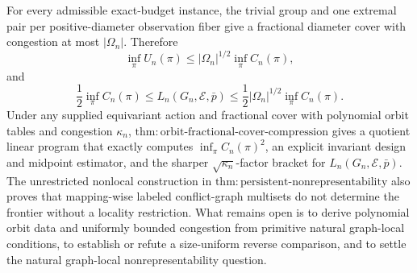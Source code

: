 For every admissible exact-budget instance, the trivial group and one extremal pair per positive-diameter observation fiber give a fractional diameter cover with congestion at most \(|\Omega_n|\). Therefore
\[
 \inf_\pi U_n(\pi)
 \le |\Omega_n|^{1/2}\inf_\pi C_n(\pi),
\]
and
\[
 \frac12\inf_\pi C_n(\pi)
 \le L_n(G_n,\mathcal E,\bar p)
 \le \frac12|\Omega_n|^{1/2}\inf_\pi C_n(\pi).
\]
Under any supplied equivariant action and fractional cover with polynomial orbit tables and congestion \(\kappa_n\), \(\mathrm{thm{:}orbit\text{-}fractional\text{-}cover\text{-}compression}\) gives a quotient linear program that exactly computes \(\inf_\pi C_n(\pi)^2\), an explicit invariant design and midpoint estimator, and the sharper \(\sqrt{\kappa_n}\)-factor bracket for \(L_n(G_n,\mathcal E,\bar p)\). The unrestricted nonlocal construction in \(\mathrm{thm{:}persistent\text{-}nonrepresentability}\) also proves that mapping-wise labeled conflict-graph multisets do not determine the frontier without a locality restriction. What remains open is to derive polynomial orbit data and uniformly bounded congestion from primitive natural graph-local conditions, to establish or refute a size-uniform reverse comparison, and to settle the natural graph-local nonrepresentability question.